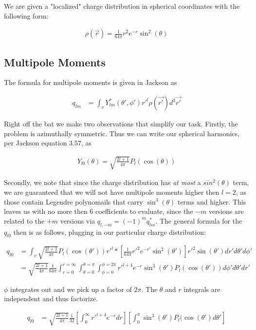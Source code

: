 \documentclass[paper=a4, fontsize=11pt]{scrartcl} %
\numberwithin{equation}{section} %
\numberwithin{figure}{section} %
\numberwithin{table}{section} %
\begin{document}
We are given a "localized" charge distribution in spherical coordinates with the following form:

\begin{align}
\rho(\vec{r}) = \frac{1}{64 \pi}r^2 e^{-r}\sin^2(\theta)
\end{align}

\subsection{Multipole Moments}

The formula for multipole moments is given in Jackson as

\begin{align}
q_{lm} &= \int_v Y^*_{lm}(\theta',\phi')r'^l\rho(\vec{r'})d^3\vec{r'} 
\end{align}

Right off the bat we make two observations that simplify our task. Firstly, the problem is azimuthally symmetric. Thus we can write our spherical harmonics, per Jackson equation 3.57, as

\begin{align}
Y_{l0}(\theta) = \sqrt{\frac{2l + 1}{4 \pi}}P_l(\cos(\theta)) 
\end{align} 

Secondly, we note that since the charge distribution has \textit{at most} a $sin^2(\theta)$ term, we are guaranteed that we will not have multipole moments higher then $l=2$, as those contain Legendre polynomails that carry $\sin^3(\theta)$ terms and higher. This leaves us with no more then 6 coefficients to evaluate, since the $-m$ versions are related to the $+m$ versions via $q_{l, -m} = (-1)^m q^*_{lm}$. The general formula for the $q_{l0}$ then is as follows, plugging in our particular charge distribution:

\begin{align}
q_{l0} &= \int_v \sqrt{\frac{2l + 1}{4\pi}}P_l(\cos(\theta'))r'^l*\left[\frac{1}{64\pi}r'^2 e^{-r'}\sin^2(\theta')\right]r'^2\sin(\theta')dr'd\theta'd\phi' \\
&= \sqrt{\frac{2l + 1}{4 \pi}}\frac{1}{64\pi} \int_{r=0}^{r=\infty}\int_{\theta=0}^{\theta=\pi}\int_{\phi=0}^{\phi=2\pi}r'^{l+4}e^{-r}\sin^3(\theta')P_l(\cos(\theta'))d\phi'd\theta'dr'
\end{align}

$\phi$ integrates out and we pick up a factor of $2 \pi$. The $\theta$ and $r$ integrals are independent and thus factorize.
 
\begin{align}
q_{l0} &= \sqrt{\frac{2l + 1}{4 \pi}}\frac{1}{32}\left[\int_0^\infty r'^{l+4}e^{-r}dr\right]\left[\int_0^{\pi}\sin^3(\theta')P_l(\cos(\theta')d\theta'\right]
\end{align} 
\end{document}
